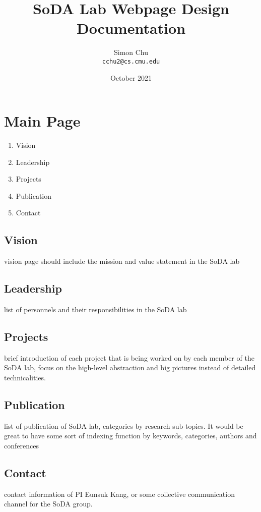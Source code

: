 \documentclass{article}
\title{SoDA Lab Webpage Design Documentation}
\author{
  Simon Chu\\
  \texttt{cchu2@cs.cmu.edu}
}
\date{October 2021}
\begin{document}
\maketitle

\section{Main Page}
\begin{enumerate}
    \item Vision
    \item Leadership
    \item Projects
    \item Publication
    \item Contact
\end{enumerate}

\subsection{Vision}
vision page should include the mission and value statement in the SoDA lab

\subsection{Leadership}
list of personnels and their responsibilities in the SoDA lab

\subsection{Projects}
brief introduction of each project that is being worked on by each member of the SoDA lab, focus on the high-level abstraction and big pictures instead of detailed technicalities.

\subsection{Publication}
list of publication of SoDA lab, categories by research sub-topics. It would be great to have some sort of indexing function by keywords, categories, authors and conferences

\subsection{Contact}
contact information of PI Eunsuk Kang, or some collective communication channel for the SoDA group.
\end{document}
